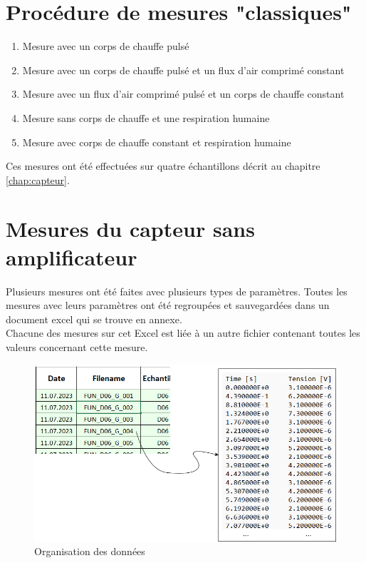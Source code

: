 \section{Procédure de mesures "classiques"}
\begin{enumerate}
    \item Mesure avec un corps de chauffe pulsé\\
    \item Mesure avec un corps de chauffe pulsé et un flux d'air comprimé constant\\
    \item Mesure avec un flux d'air comprimé pulsé et un corps de chauffe constant\\
    \item Mesure sans corps de chauffe et une respiration humaine\\
    \item Mesure avec corps de chauffe constant et respiration humaine
\end{enumerate}
Ces mesures ont été effectuées sur quatre échantillons décrit au chapitre \ref{chap:capteur}. 

\section{Mesures du capteur sans amplificateur}
Plusieurs mesures ont été faites avec plusieurs types de paramètres. Toutes les mesures avec leurs paramètres ont été regroupées et sauvegardées
dans un document excel qui se trouve en annexe.\\
Chacune des mesures sur cet Excel est liée à un autre fichier contenant toutes les valeurs concernant cette mesure.
\begin{figure}[H]
    \centering
    \includegraphics[scale = 0.4]{assets/figures/Data.png}
    \caption{Organisation des données}
    \label{fig:data_orga}
\end{figure}

